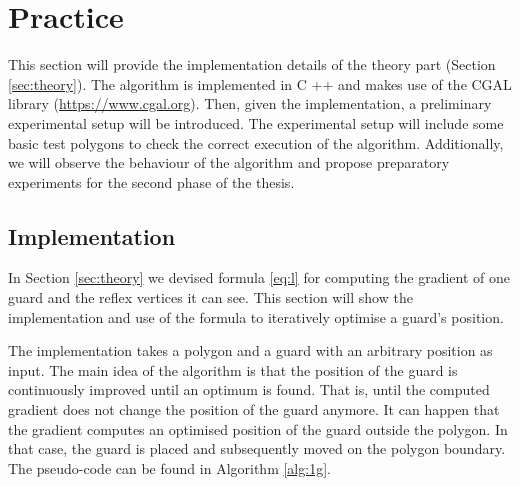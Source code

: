 \section{Practice}
\label{sec:experiments}

This section will provide the implementation details of the theory part (Section \ref{sec:theory}). The algorithm is implemented in C ++ and makes use of the CGAL library (\url{https://www.cgal.org}). Then, given the implementation, a preliminary experimental setup will be introduced. The experimental setup will include some basic test polygons to check the correct execution of the algorithm. Additionally, we will observe the behaviour of the algorithm and propose preparatory experiments for the second phase of the thesis.
\subsection{Implementation}
In Section \ref{sec:theory} we devised formula \ref{eq:l} for computing the gradient of one guard and the reflex vertices it can see. This section will show the implementation and use of the formula to iteratively optimise a guard's position. 

The implementation takes a polygon and a guard with an arbitrary position as input. The main idea of the algorithm is that the position of the guard is continuously improved until an optimum is found. That is, until the computed gradient does not change the position of the guard anymore.
It can happen that the gradient computes an optimised position of the guard outside the polygon. In that case, the guard is placed and subsequently moved on the polygon boundary. The pseudo-code can be found in Algorithm \ref{alg:1g}.

